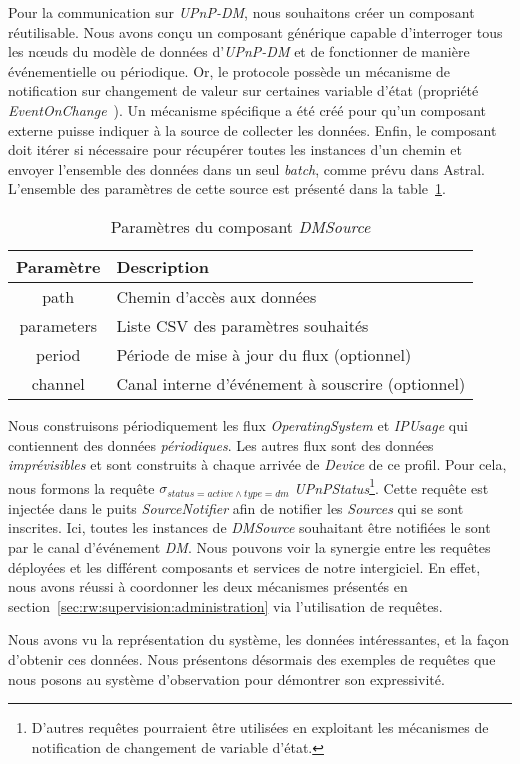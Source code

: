 Pour la communication sur \textit{UPnP-DM}, nous souhaitons créer un composant réutilisable. Nous avons conçu un composant générique capable d'interroger tous les nœuds du modèle de données d'\textit{UPnP-DM} et de fonctionner de manière événementielle ou périodique. Or, le protocole possède un mécanisme de notification sur changement de valeur sur certaines variable d'état (propriété \textit{EventOnChange}~\cite{UPnP:DM2}). Un mécanisme spécifique a été créé pour qu'un composant externe puisse indiquer à la source de collecter les données. Enfin, le composant doit itérer si nécessaire pour récupérer toutes les instances d'un chemin et envoyer l'ensemble des données dans un seul \textit{batch}, comme prévu dans Astral. L'ensemble des paramètres de cette source est présenté dans la table~\ref{tab:valid:domvision:dmsource}.

\begin{table}[ht]
    \centering
    \begin{tabular}{cl}
        Paramètre & Description \\ \midrule
        path & Chemin d'accès aux données \\
        parameters & Liste CSV des paramètres souhaités \\
        period & Période de mise à jour du flux (optionnel) \\
        channel & Canal interne d'événement à souscrire (optionnel)
    \end{tabular}
    \caption{Paramètres du composant \textit{DMSource}}\label{tab:valid:domvision:dmsource}
\end{table}

Nous construisons périodiquement les flux \textit{OperatingSystem} et \textit{IPUsage} qui contiennent des données \textit{périodiques}. Les autres flux sont des données \textit{imprévisibles} et sont construits à chaque arrivée de \textit{Device} de ce profil. Pour cela, nous formons la requête $\sigma_{status=active\wedge type=dm}$ \textit{UPnPStatus}\footnote{D'autres requêtes pourraient être utilisées en exploitant les mécanismes de notification de changement de variable d'état.}. Cette requête est injectée dans le puits \textit{SourceNotifier} afin de notifier les \textit{Sources} qui se sont inscrites. Ici, toutes les instances de \textit{DMSource} souhaitant être notifiées le sont par le canal d'événement \textit{DM}. Nous pouvons voir la synergie entre les requêtes déployées et les différent composants et services de notre intergiciel. En effet, nous avons réussi à coordonner les deux mécanismes présentés en section~\ref{sec:rw:supervision:administration} via l'utilisation de requêtes.

Nous avons vu la représentation du système, les données intéressantes, et la façon d'obtenir ces données. Nous présentons désormais des exemples de requêtes que nous posons au système d'observation pour démontrer son expressivité.
